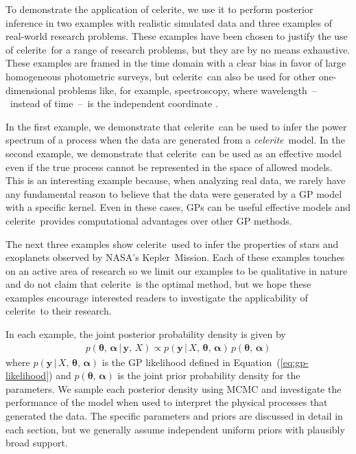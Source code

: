 \documentclass[manuscript, letterpaper]{aastex6}
\makeatletter
\let\origsection\section
\renewcommand\section{\@ifstar{\starsection}{\nostarsection}}
\newcommand\nostarsection[1]{\sectionprelude\origsection{#1}}
\newcommand\starsection[1]{\sectionprelude\origsection*{#1}}
\newcommand\sectionprelude{\vspace{1em}}
\newcommand{\project}[1]{\textsf{#1}}
\newcommand{\kepler}{\project{Kepler}}
\newcommand{\celerite}{\project{celerite}}
\newcommand{\celeriteterm}{\emph{celerite}}
\renewcommand{\eqref}[1]{\ref{eq:#1}}
\newcommand{\Eq}[1]{Equation~(\eqref{#1})}
\newcommand{\eq}[1]{\Eq{#1}}
\newcommand{\eqlabel}[1]{\label{eq:#1}}
\newcommand{\sectlabel}[1]{\label{sect:#1}}
\newcommand{\bvec}[1]{{\ensuremath{\boldsymbol{#1}}}}
\newcommand{\response}[1]{{#1}}
\newcommand{\responseb}[1]{{#1}}
\makeatother
\begin{document}
\section{Examples}\sectlabel{examples}

\response{
    To demonstrate the application of \celerite, we use it to perform posterior
    inference in two examples with realistic simulated data and three examples of
    real-world research problems.
    These examples have been chosen to justify the use of \celerite\ for a range
    of research problems, but they are by no means exhaustive.
    These examples are framed in the time domain with a clear bias in favor of
    large homogeneous photometric surveys, but \celerite\ can also be used for
    other one-dimensional problems like, for example, spectroscopy, where
    wavelength~--~instead of time~--~is the independent coordinate \citep[see][for
        a potential application]{Czekala:2017}.

    In the first example, we demonstrate that \celerite\ can be used to infer
    the power spectrum of a process when the data are generated from a
    \celeriteterm\ model.
    In the second example, we demonstrate that \celerite\ can be used as an
    effective model even if the true process cannot be represented in the space of
    allowed models.
    This is an interesting example because, when analyzing real data, we rarely
    have any fundamental reason to believe that the data were generated by a GP
    model with a specific kernel.
    Even in these cases, GPs can be useful effective models and \celerite\
    provides computational advantages over other GP methods.

    The next three examples show \celerite\ used to infer the properties of stars
    and exoplanets observed by NASA's \kepler\ Mission.
    Each of these examples touches on an active area of research so we limit our
    examples to be qualitative in nature and do not claim that \celerite\ is the
    optimal method, but we hope these examples encourage interested readers to
    investigate the applicability of \celerite\ to their research.}

\response{
    In each example, the joint posterior probability density is given by
    \begin{eqnarray}\eqlabel{joint-post}
        p(\bvec{\theta},\,\bvec{\alpha}\,|\,\bvec{y},\,X) \propto
        p(\bvec{y}\,|\,{X,\,\bvec{\theta}},\,\bvec{\alpha})\,
        p(\bvec{\theta},\,\bvec{\alpha})
    \end{eqnarray}
    where $p(\bvec{y}\,|\,{X,\,\bvec{\theta}},\,\bvec{\alpha})$ is the GP
    likelihood defined in \eq{gp-likelihood} and $p(\bvec{\theta},\,\bvec{\alpha})$
    is the joint prior probability density for the parameters.
    We sample each posterior density using MCMC and investigate the performance of
    the model when used to interpret the physical processes that generated the
    data.
    The specific parameters and priors are discussed in detail in each section,
    but we generally assume \responseb{independent} uniform priors with plausibly
    broad support.}
\end{document}
